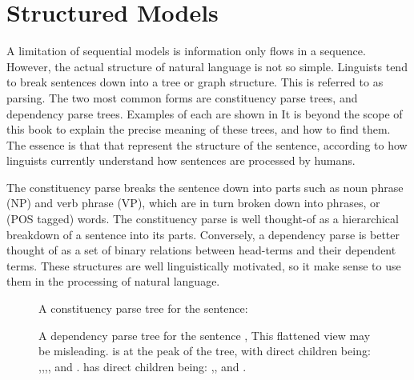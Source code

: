 \documentclass[12pt,parskip]{komatufte}
\begin{document}
\section{Structured Models}

A limitation of sequential models is information only flows in a sequence.
However, the actual structure of natural language is not so simple.
Linguists tend to break sentences down into a tree or graph structure.
This is referred to as parsing.
The two most common forms are constituency parse trees, and dependency parse trees.
Examples of each are shown in 
It is beyond the scope of this book to explain the precise meaning of these trees, and how to find them.
The essence is that that represent the structure of the sentence,
according to how linguists currently understand how sentences are processed by humans.

The constituency parse breaks the sentence down into parts such as noun phrase (NP) and verb phrase (VP),
which are in turn broken down into phrases, or (POS tagged) words.
The constituency parse is well thought-of as a hierarchical breakdown of a sentence into its parts.
Conversely, a dependency parse is better thought of as a set of binary relations between head-terms and their dependent terms.
These structures are well linguistically motivated, so it make sense to use them in the processing of natural language.

\begin{figure}
	\caption{A constituency parse tree for the sentence: }
	\label{fig:consparse}
\end{figure}


\begin{figure}
	\caption{A dependency parse tree for the sentence ,
	This flattened view may be misleading.
	 is at the peak of the tree, with direct children	being:
	,,,,
	and .
	 has direct children being: ,, and .
	}
	\label{fig:depparse}
\end{figure}
\end{document}
